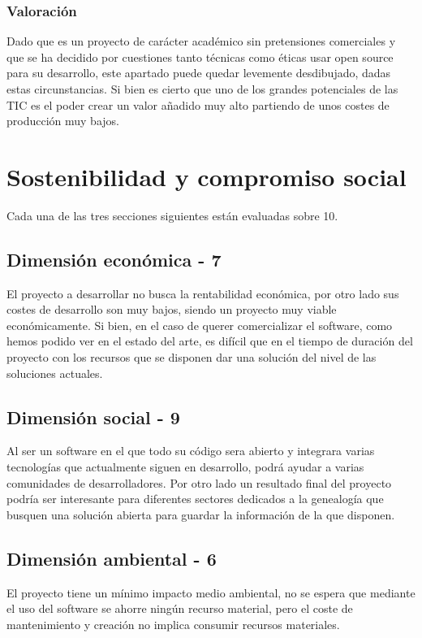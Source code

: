 \subsubsection{Valoración}
Dado que es un proyecto de carácter académico sin pretensiones comerciales y que se ha decidido por cuestiones tanto técnicas como éticas usar open source para su desarrollo, este apartado puede quedar levemente desdibujado, dadas estas circunstancias. Si bien es cierto que uno de los grandes potenciales de las TIC es el poder crear un valor añadido muy alto partiendo de unos costes de producción muy bajos.

\section{Sostenibilidad y compromiso social}
Cada una de las tres secciones siguientes están evaluadas sobre 10.
\subsection{Dimensión económica - 7}
El proyecto a desarrollar no busca la rentabilidad económica, por otro lado sus costes de desarrollo son muy bajos, siendo un proyecto muy viable económicamente. Si bien, en el caso de querer comercializar el software, como hemos podido ver en el estado del arte, es difícil que en el tiempo de duración del proyecto con los recursos que se disponen dar una solución del nivel de las soluciones actuales.
\subsection{Dimensión social - 9}
Al ser un software en el que todo su código sera abierto y integrara varias tecnologías que actualmente siguen en desarrollo, podrá ayudar a varias comunidades de desarrolladores. Por otro lado un resultado final del proyecto podría ser interesante para diferentes sectores dedicados a la genealogía que busquen una solución abierta para guardar la información de la que disponen.
\subsection{Dimensión ambiental - 6}
El proyecto tiene un mínimo impacto medio ambiental, no se espera que mediante el uso del software se ahorre ningún recurso material, pero el coste de mantenimiento y creación no implica consumir recursos materiales.